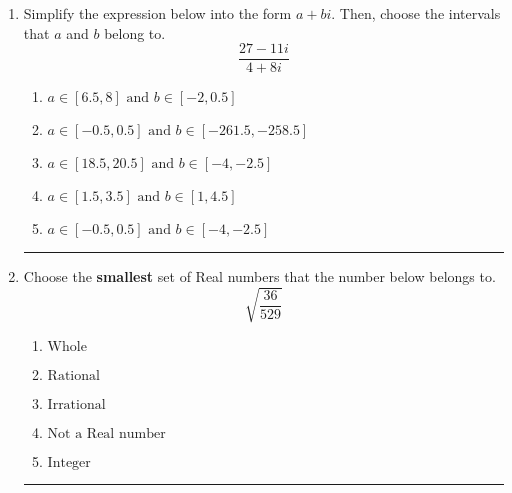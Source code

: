 \documentclass[14pt]{extbook}
\newcommand{\litem}[1]{\item#1\hspace*{-1cm}\rule{\textwidth}{0.4pt}}
\begin{document}
\begin{enumerate}
{\begin{enumerate}[label=\Alph*.]
\end{enumerate} }
\litem{
Simplify the expression below into the form $a+bi$. Then, choose the intervals that $a$ and $b$ belong to.\[ \frac{27 - 11 i}{4 + 8 i} \]\begin{enumerate}[label=\Alph*.]
\item \( a \in [6.5, 8] \text{ and } b \in [-2, 0.5] \)
\item \( a \in [-0.5, 0.5] \text{ and } b \in [-261.5, -258.5] \)
\item \( a \in [18.5, 20.5] \text{ and } b \in [-4, -2.5] \)
\item \( a \in [1.5, 3.5] \text{ and } b \in [1, 4.5] \)
\item \( a \in [-0.5, 0.5] \text{ and } b \in [-4, -2.5] \)

\end{enumerate} }
\litem{
Choose the \textbf{smallest} set of Real numbers that the number below belongs to.\[ \sqrt{\frac{36}{529}} \]\begin{enumerate}[label=\Alph*.]
\item \( \text{Whole} \)
\item \( \text{Rational} \)
\item \( \text{Irrational} \)
\item \( \text{Not a Real number} \)
\item \( \text{Integer} \)

\end{enumerate} }
\end{enumerate}
\end{document}
